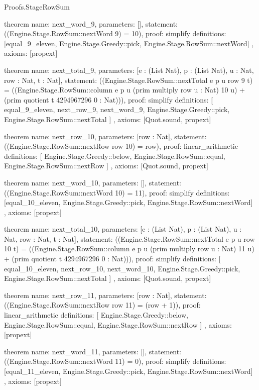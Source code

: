 \begin{lexlean}{Proofs.StageRowSum}
\begin{semanticmodule}
theorem{
  name: next_word_9,
  parameters: [],
  statement: ((Engine.Stage.RowSum::nextWord 9) = 10),
  proof: simplify{
    definitions: [equal_9_eleven, Engine.Stage.Greedy::pick, Engine.Stage.RowSum::nextWord]
  },
  axioms: [propext]
}

theorem{
  name: next_total_9,
  parameters: [e : (List Nat), p : (List Nat), u : Nat, row : Nat, t : Nat],
  statement: ((Engine.Stage.RowSum::nextTotal e p u row 9 t) = ((Engine.Stage.RowSum::column e p u (prim multiply row u : Nat) 10 u) + (prim quotient t 4294967296 0 : Nat))),
  proof: simplify{
    definitions: [
      equal_9_eleven,
      next_row_9,
      next_word_9,
      Engine.Stage.Greedy::pick,
      Engine.Stage.RowSum::nextTotal
    ]
  },
  axioms: [Quot.sound, propext]
}

theorem{
  name: next_row_10,
  parameters: [row : Nat],
  statement: ((Engine.Stage.RowSum::nextRow row 10) = row),
  proof: linear_arithmetic{
    definitions: [
      Engine.Stage.Greedy::below,
      Engine.Stage.RowSum::equal,
      Engine.Stage.RowSum::nextRow
    ]
  },
  axioms: [Quot.sound, propext]
}

theorem{
  name: next_word_10,
  parameters: [],
  statement: ((Engine.Stage.RowSum::nextWord 10) = 11),
  proof: simplify{
    definitions: [equal_10_eleven, Engine.Stage.Greedy::pick, Engine.Stage.RowSum::nextWord]
  },
  axioms: [propext]
}

theorem{
  name: next_total_10,
  parameters: [e : (List Nat), p : (List Nat), u : Nat, row : Nat, t : Nat],
  statement: ((Engine.Stage.RowSum::nextTotal e p u row 10 t) = ((Engine.Stage.RowSum::column e p u (prim multiply row u : Nat) 11 u) + (prim quotient t 4294967296 0 : Nat))),
  proof: simplify{
    definitions: [
      equal_10_eleven,
      next_row_10,
      next_word_10,
      Engine.Stage.Greedy::pick,
      Engine.Stage.RowSum::nextTotal
    ]
  },
  axioms: [Quot.sound, propext]
}

theorem{
  name: next_row_11,
  parameters: [row : Nat],
  statement: ((Engine.Stage.RowSum::nextRow row 11) = (row + 1)),
  proof: linear_arithmetic{
    definitions: [
      Engine.Stage.Greedy::below,
      Engine.Stage.RowSum::equal,
      Engine.Stage.RowSum::nextRow
    ]
  },
  axioms: [propext]
}

theorem{
  name: next_word_11,
  parameters: [],
  statement: ((Engine.Stage.RowSum::nextWord 11) = 0),
  proof: simplify{
    definitions: [equal_11_eleven, Engine.Stage.Greedy::pick, Engine.Stage.RowSum::nextWord]
  },
  axioms: [propext]
}


\end{semanticmodule}
\end{lexlean}
